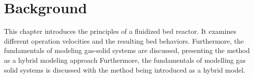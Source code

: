 \newpage
\chapter{Background}
\label{ch:background}
This chapter introduces the principles of a fluidized bed reactor. It examines different operation velocities and the resulting bed behaviors. Furthermore, the fundamentals of modeling gas-solid systems are discussed, presenting the \MP method as a hybrid modeling approach
Furthermore, the fundamentals of modelling gas solid systems is discussed with the \MP method being introduced as a hybrid model.















